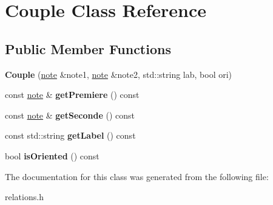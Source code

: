 \hypertarget{class_couple}{}\section{Couple Class Reference}
\label{class_couple}
\subsection*{Public Member Functions}
\begin{DoxyCompactItemize}
\item 
\mbox{\label{class_couple_aa1f1400e92e062c0ecdd6f81fdc47d07}} 
{\bfseries Couple} (\hyperlink{classnote}{note} \&note1, \hyperlink{classnote}{note} \&note2, std\+::string lab, bool ori)
\item 
\mbox{\label{class_couple_a25c14d126cb78805740000253b32f6d7}} 
const \hyperlink{classnote}{note} \& {\bfseries get\+Premiere} () const
\item 
\mbox{\label{class_couple_a837894fc5a70507b67c5c3f19da7b9da}} 
const \hyperlink{classnote}{note} \& {\bfseries get\+Seconde} () const
\item 
\mbox{\label{class_couple_acf2f8ba4907cf728a5d8110ac2abdff3}} 
const std\+::string {\bfseries get\+Label} () const
\item 
\mbox{\label{class_couple_aa105334f2fa5185c963b54c265720f2e}} 
bool {\bfseries is\+Oriented} () const
\end{DoxyCompactItemize}


The documentation for this class was generated from the following file\+:\begin{DoxyCompactItemize}
\item 
relations.\+h\end{DoxyCompactItemize}
